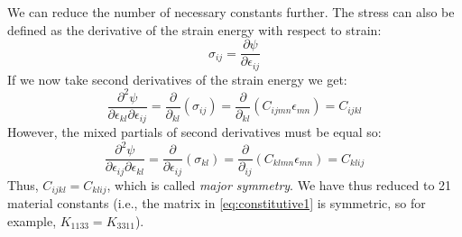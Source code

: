 \documentclass{article}
\begin{document}
We can reduce the number of necessary constants further.  The stress can also be defined as the derivative of the strain energy with respect to strain:
\begin{equation}
\sigma_{ij} = \frac{\partial \psi}{\partial \epsilon_{ij}}
\end{equation}
If we now take second derivatives of the strain energy we get:
\begin{equation}
\frac{\partial^2 \psi}{\partial \epsilon_{kl} \partial \epsilon_{ij}} = \frac{\partial}{\partial_{kl}} \left( \sigma_{ij} \right) = \frac{\partial}{\partial_{kl}} \left( C_{ijmn} \epsilon_{mn}\right) = C_{ijkl}
\end{equation}
However, the mixed partials of second derivatives must be equal so:
\begin{equation}
\frac{\partial^2 \psi}{\partial \epsilon_{ij} \partial \epsilon_{kl}} = \frac{\partial}{\partial \epsilon_{ij}} \left( \sigma_{kl} \right) = \frac{\partial}{\partial_{ij}} \left( C_{klmn} \epsilon_{mn}\right) = C_{klij}
\end{equation}
Thus, $C_{ijkl} = C_{klij}$, which is called \emph{major symmetry}.  We have thus reduced to 21 material constants (i.e., the matrix in \cref{eq:constitutive1} is symmetric, so for example, $K_{1133} = K_{3311}$).
\end{document}
